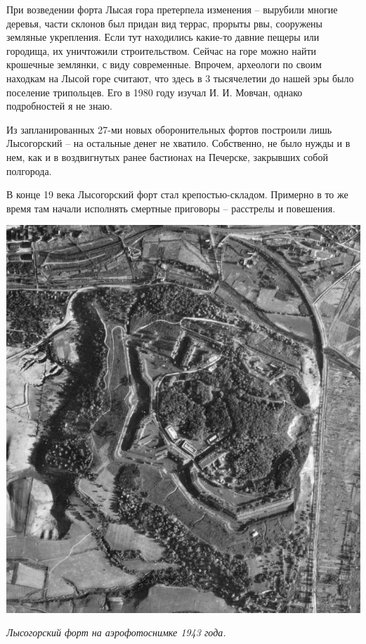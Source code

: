 При возведении форта Лысая гора претерпела изменения – вырубили многие деревья, части склонов был придан вид террас, прорыты рвы, сооружены земляные укрепления. Если тут находились какие-то давние пещеры или городища, их уничтожили строительством. Сейчас на горе можно найти крошечные землянки, с виду современные. Впрочем, археологи по своим находкам на Лысой горе считают, что здесь в 3 тысячелетии до нашей эры было поселение трипольцев. Его в 1980 году изучал И. И. Мовчан, однако подробностей я не знаю.

Из запланированных 27-ми новых оборонительных  фортов построили лишь Лысогорский – на остальные денег не хватило. Собственно, не было нужды и в нем, как и в воздвигнутых ранее бастионах на Печерске, закрывших собой полгорода.

В конце 19 века Лысогорский форт стал крепостью-складом. Примерно в то же время там начали исполнять смертные приговоры – расстрелы и повешения.

\begin{center}
\includegraphics[width=\textwidth]{chast-lys-gory/zazver/aero.jpg}

\textit{Лысогорский форт на аэрофотоснимке 1943 года.}
\end{center}

